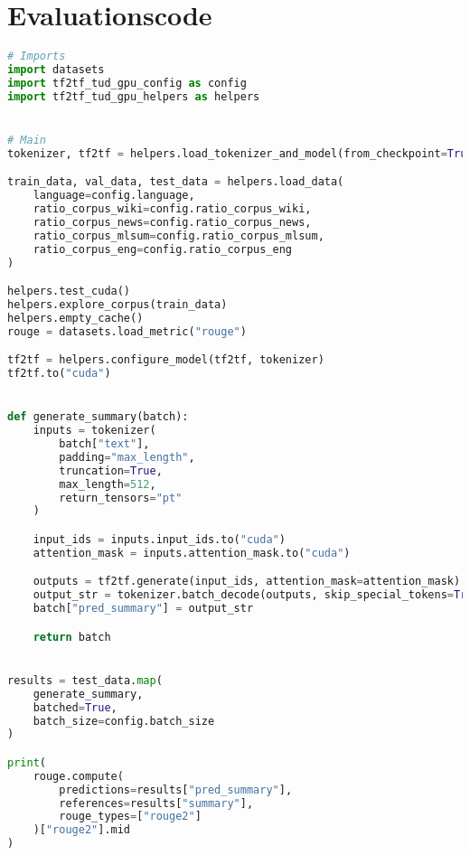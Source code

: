 \section*{Evaluationscode}
\begin{lstlisting}[language=Python, caption=Evaluationscode]
# Imports
import datasets
import tf2tf_tud_gpu_config as config
import tf2tf_tud_gpu_helpers as helpers


# Main
tokenizer, tf2tf = helpers.load_tokenizer_and_model(from_checkpoint=True)

train_data, val_data, test_data = helpers.load_data(
    language=config.language,
    ratio_corpus_wiki=config.ratio_corpus_wiki,
    ratio_corpus_news=config.ratio_corpus_news,
    ratio_corpus_mlsum=config.ratio_corpus_mlsum,
    ratio_corpus_eng=config.ratio_corpus_eng
)

helpers.test_cuda()
helpers.explore_corpus(train_data)
helpers.empty_cache()
rouge = datasets.load_metric("rouge")

tf2tf = helpers.configure_model(tf2tf, tokenizer)
tf2tf.to("cuda")


def generate_summary(batch):
    inputs = tokenizer(
        batch["text"],
        padding="max_length",
        truncation=True,
        max_length=512,
        return_tensors="pt"
    )

    input_ids = inputs.input_ids.to("cuda")
    attention_mask = inputs.attention_mask.to("cuda")

    outputs = tf2tf.generate(input_ids, attention_mask=attention_mask)
    output_str = tokenizer.batch_decode(outputs, skip_special_tokens=True)
    batch["pred_summary"] = output_str

    return batch


results = test_data.map(
    generate_summary,
    batched=True,
    batch_size=config.batch_size
)

print(
    rouge.compute(
        predictions=results["pred_summary"],
        references=results["summary"],
        rouge_types=["rouge2"]
    )["rouge2"].mid
)
\end{lstlisting}
